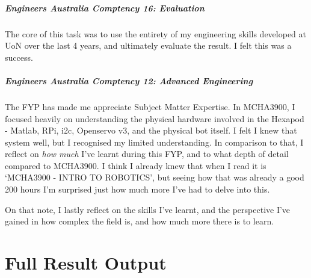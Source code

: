 \documentclass{UoNMCHA}
\numberwithin{equation}{section}
\begin{document}
\subparagraph{Engineers Australia Comptency 16: Evaluation}
The core of this task was to use the entirety of my engineering skills developed at UoN over the last 4 years, and ultimately evaluate the result. I felt this was a success.


\subparagraph{Engineers Australia Comptency 12: Advanced Engineering}
The FYP has made me appreciate Subject Matter Expertise. In MCHA3900, I focused heavily on understanding the physical hardware involved in the Hexapod - Matlab, RPi, i2c, Openservo v3, and the physical bot itself. I felt I knew that system well, but I recognised my limited understanding. In comparison to that, I reflect on \textit{how much} I've learnt during this FYP, and to what depth of detail compared to MCHA3900. I think I already knew that when I read it is `MCHA3900 - INTRO TO ROBOTICS', but seeing how that was already a good 200 hours I'm surprised just how much more I've had to delve into this.

On that note, I lastly reflect on the skills I've learnt, and the perspective I've gained in how complex the field is, and how much more there is to learn.


\clearpage \section{Full Result Output}
\end{document}
